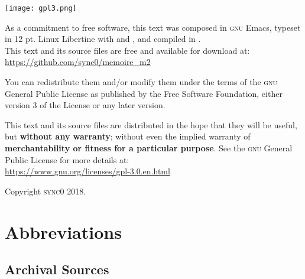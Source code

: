 \documentclass[version=last,draft=true,paper=A4,portrait,twoside=true,twocolumn=false,headinclude=false,footinclude=false,fontsize=12,BCOR=20mm,DIV=calc,pagesize=auto,titlepage=firstiscover,mpinclude=true,open=right,chapterprefix=true,numbers=autoendperiod,headsepline=false,headings=twolinechapter,parskip=false]{scrbook}
\begin{document}
\newpage
\begin{center}
\vspace*{\fill}
\noindent
\texttt{[image: gpl3.png]}\par
\vspace{1\baselineskip}

As a commitment to free software, this text was composed in \textsc{gnu}
Emacs, typeset in 12 pt. Linux Libertine with \hologo{\fmtname}
and \KOMAScript, and compiled in .\\
\vspace{1\baselineskip}
This text and its source files are free and available for download at:\\
\vspace{1\baselineskip}
\url{https://github.com/sync0/memoire_m2}
\vspace{1\baselineskip}

\noindent You can redistribute them and/or modify them under the terms of
the \textsc{gnu} General Public License as published by the Free Software
Foundation, either version 3 of the License or any later version.

This text and its source files are distributed in the hope that they will
be useful, but \textbf{without any warranty}; without even the implied
warranty of \textbf{merchantability or fitness for a particular purpose}.
See the \textsc{gnu} General Public License for more details at:\\ 
\vspace{1\baselineskip}
\url{https://www.gnu.org/licenses/gpl-3.0.en.html} 

\vspace{1\baselineskip}
\noindent
Copyright \textcopyright \textsc{sync0} 2018.
\end{center}




\newpage
\tableofcontents 
\frontmatter
\pagestyle{plain}
\chapter*{Abbreviations} 
\section*{Archival Sources}
\end{document}
